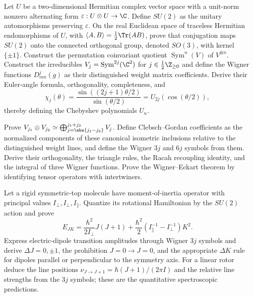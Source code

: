 \begin{exercise}
Let $U$ be a two-dimensional Hermitian complex vector space with a unit-norm
nonzero alternating form $\varepsilon:U\otimes U\to\C$.  Define $SU(2)$ as
the unitary automorphisms preserving $\varepsilon$.  On the real Euclidean
space of traceless Hermitian endomorphisms of $U$, with
$\langle A,B\rangle=\tfrac12\Tr(AB)$, prove that conjugation maps
$SU(2)$ onto the connected orthogonal group, denoted $SO(3)$, with kernel
$\{\pm1\}$.  Construct the
permutation coinvariant quotient $\operatorname{Sym}^n(V)$ of $V^{\otimes n}$.
Construct the irreducibles $V_j=\operatorname{Sym}^{2j}(\C^2)$ for
$j\in\frac12\Z_{\ge0}$ and define the Wigner functions
$D^j_{mn}(g)$ as their distinguished weight matrix coefficients.  Derive
their Euler-angle formula, orthogonality, completeness, and
\[
 \chi_j(\theta)=\frac{\sin((2j+1)\theta/2)}{\sin(\theta/2)}
                =U_{2j}(\cos(\theta/2)),
\]
thereby defining the Chebyshev polynomials $U_n$.
\end{exercise}

\begin{exercise}
Prove
$V_{j_1}\otimes V_{j_2}\simeq
\bigoplus_{j=\abs{j_1-j_2}}^{j_1+j_2}V_j$.
Define Clebsch--Gordan coefficients as the normalized components of these
canonical isometric inclusions relative to the distinguished weight lines,
and define the Wigner $3j$ and $6j$ symbols from them.  Derive their
orthogonality, the triangle rules, the Racah recoupling identity, and the
integral of three Wigner functions.  Prove the Wigner--Eckart theorem by
identifying tensor operators with intertwiners.
\end{exercise}

\begin{exercise}
Let a rigid symmetric-top molecule have moment-of-inertia operator with
principal values $I_\perp,I_\perp,I_\parallel$.  Quantize its rotational
Hamiltonian by the $SU(2)$ action and prove
\[
 E_{JK}=\frac{\hbar^2}{2I_\perp}J(J+1)
 +\frac{\hbar^2}{2}\left(I_\parallel^{-1}-I_\perp^{-1}\right)K^2.
\]
Express electric-dipole transition amplitudes through Wigner $3j$ symbols and
derive $\Delta J=0,\pm1$, the prohibition $J=0\to J=0$, and the appropriate
$\Delta K$ rule for dipoles parallel or perpendicular to the symmetry axis.
For a linear rotor deduce the line positions
$\nu_{J\to J+1}=\hbar(J+1)/(2\pi I)$ and the relative line strengths from the
$3j$ symbols; these are the quantitative spectroscopic predictions.
\end{exercise}

